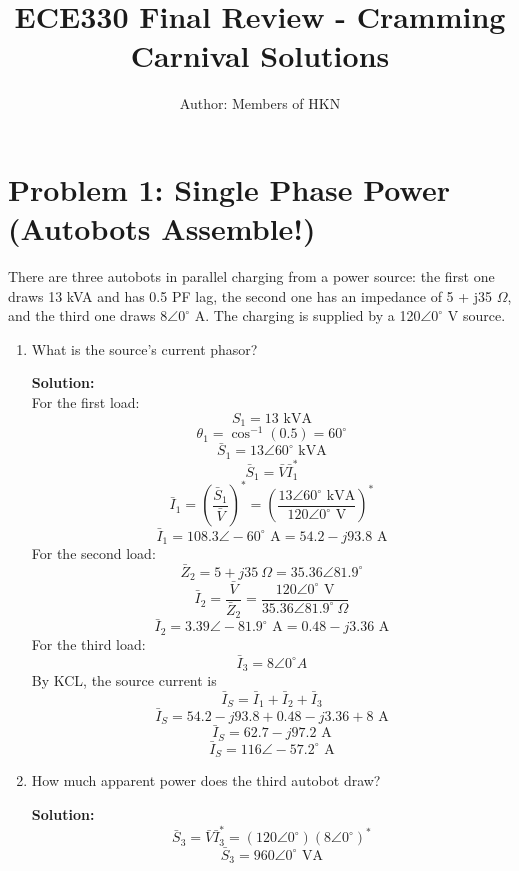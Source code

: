 \documentclass{article}
\title{ECE330 Final Review - Cramming Carnival Solutions}
\author{Author: Members of HKN}
\date{}
\begin{document}
\maketitle


\noindent
\section*{Problem 1: Single Phase Power (Autobots Assemble!)} %
There are three autobots in parallel charging from a power source: the first one draws 13 kVA and has 0.5 PF lag, the second one has an impedance of 5 + j35 $\Omega$, and the third one draws 8$\angle 0^{\circ}$ A. The charging is supplied by a 120$\angle 0^{\circ}$ V source.
\begin{enumerate}[label=(\alph*)]
    \item {What is the source's current phasor?}

\textbf{Solution:} \\
For the first load:
$$S_1 = 13\text{ kVA}$$
$$\theta_1 = \cos^{-1}(0.5) = 60^{\circ}$$
$$\bar{S}_1 = 13\angle 60^{\circ} \text{ kVA} $$
$$\bar{S}_1 = \bar{V}\bar{I}_1^{\ast}$$
$$\bar{I}_1 = \left(\frac{\bar{S}_1}{\bar{V}}\right)^{\ast} = \left(\frac{13 \angle 60^{\circ} \text{ kVA}}{120 \angle 0^{\circ} \text{ V}}\right)^{\ast}$$
$$\bar{I}_1 = 108.3 \angle -60^{\circ} \text{ A} = 54.2 - j93.8 \text{ A}$$
For the second load:
$$\bar{Z}_2 = 5 + j35\ \Omega = 35.36 \angle 81.9^{\circ}$$
$$\bar{I}_2 = \frac{\bar{V}}{\bar{Z}_2} = \frac{120\angle 0^{\circ}\text{ V}}{35.36\angle 81.9^{\circ} \ \Omega}$$
$$\bar{I}_2 = 3.39 \angle -81.9^{\circ} \text{ A} = 0.48 - j3.36 \text{ A}$$
For the third load:
$$\bar{I}_3 = 8\angle 0^{\circ} A$$
By KCL, the source current is
$$\bar{I}_S = \bar{I}_1 + \bar{I}_2 + \bar{I}_3$$
$$\bar{I}_S = 54.2 - j93.8 + 0.48 - j3.36 + 8 \text{ A}$$
$$\bar{I}_S = 62.7 - j97.2 \text{ A}$$
$$\boxed{\bar{I}_S = 116 \angle -57.2^{\circ} \text{ A}}$$

    \item {How much apparent power does the third autobot draw?}
    
\textbf{Solution:} \\
$$\bar{S}_3 = \bar{V}\bar{I}_3^{\ast} = (120\angle 0^{\circ})(8\angle 0^{\circ})^{\ast}$$
$$\boxed{\bar{S}_3 = 960\angle 0^{\circ} \text{ VA}}$$
\end{enumerate}

\newpage %
\noindent
\end{document}
